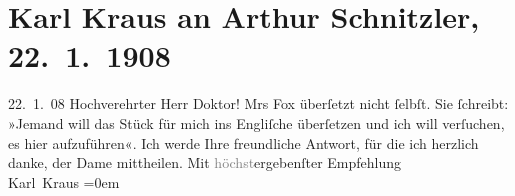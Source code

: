 

         
         \renewcommand{\erwaehntePersonen}{Personen: Kete Fox}
         \renewcommand{\erwaehnteOrte}{Orte: England, Wien}
         \renewcommand{\erwaehnteWerke}{Werke: Der Schleier der Beatrice. Schauspiel in fünf Akten}
               \section[Karl Kraus an Arthur Schnitzler, 22. 1. 1908]{ Karl Kraus an Arthur Schnitzler, 22. 1. 1908}\nopagebreak{}\rehead{ }\begin{ledgroupsized}[t]{13cm}\normalsize\beginnumbering \toendnotes[C]{\smallbreak\pagebreak[2]} 
\toendnotes[C]{\smallbreak}\pstart
           \raggedleft{}{\pb}22. 1. 08\pend
           \pstart{}Hochverehrter Herr Doktor!\pend\pstart
           Mrs Fox überſetzt nicht ſelbſt. Sie ſchreibt:
               »Jemand will das Stück für
               mich ins Engliſche überſetzen und ich will
               verſuchen, es hier aufzuführen«. Ich werde Ihre freundliche Antwort, für die ich
               herzlich danke, der Dame mittheilen.\pend
           \pstart
           Mit \textcolor{gray}{höchst}ergebenſter Empfehlung{\\[\baselineskip]}\spacefill\mbox{Karl Kraus}\pend
           \leftskip=0em{}
         
         \endnumbering{}\end{ledgroupsized}  \newcommand{\dateiname}{L01755}\newcommand{\titel}{Karl Kraus an Arthur Schnitzler, 22. 1. 1908}\newcommand{\editorInnen}{Martin Anton Müller und Gerd-Hermann Susen}
      